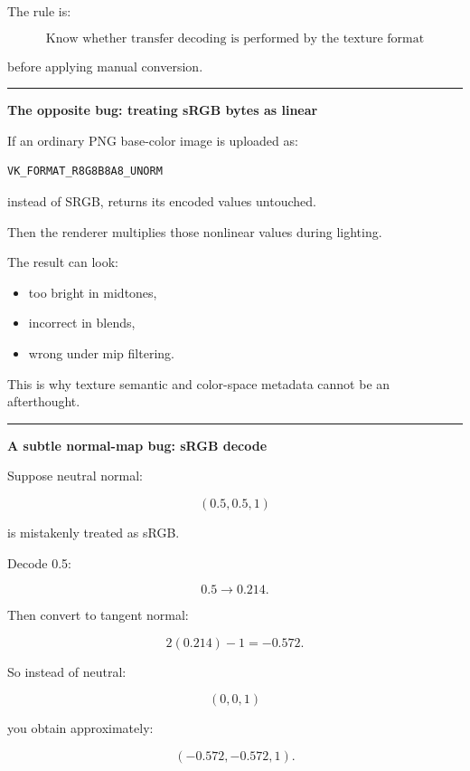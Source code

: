 The rule is:

\[
\boxed{
\text{Know whether transfer decoding is performed by the texture format}
}
\]

before applying manual conversion.

\begin{center}\rule{0.5\linewidth}{0.5pt}\end{center}

\textbf{The opposite bug: treating sRGB bytes as linear}

If an ordinary PNG base-color image is uploaded as:

\begin{verbatim}
VK_FORMAT_R8G8B8A8_UNORM
\end{verbatim}

instead of SRGB,  returns its encoded values untouched.

Then the renderer multiplies those nonlinear values during lighting.

The result can look:

\begin{itemize}
\tightlist
\item
  too bright in midtones,
\item
  incorrect in blends,
\item
  wrong under mip filtering.
\end{itemize}

This is why texture semantic and color-space metadata cannot be an afterthought.

\begin{center}\rule{0.5\linewidth}{0.5pt}\end{center}

\textbf{A subtle normal-map bug: sRGB decode}

Suppose neutral normal:

\[
(0.5,0.5,1)
\]

is mistakenly treated as sRGB.

Decode 0.5:

\[
0.5\rightarrow0.214.
\]

Then convert to tangent normal:

\[
2(0.214)-1
=
-0.572.
\]

So instead of neutral:

\[
(0,0,1)
\]

you obtain approximately:

\[
(-0.572,-0.572,1).
\]

